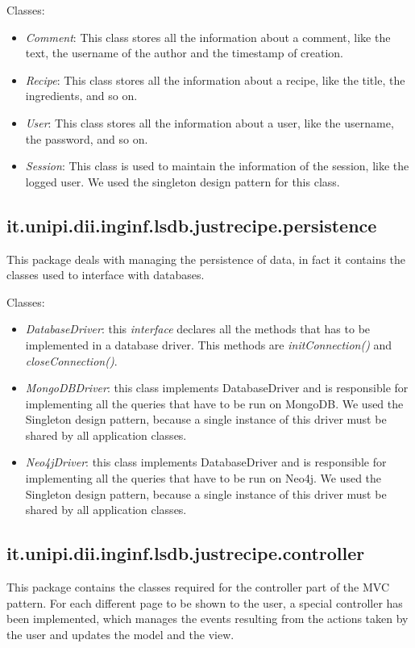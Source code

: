 \documentclass[a4paper]{report}
\begin{document}
\noindent Classes:
  \begin{itemize}
	\item \emph{Comment}: This class stores all the information about a comment, like the text, the username of the author and the timestamp of creation. 
	\item \emph{Recipe}: This class stores all the information about a recipe, like the title, the ingredients, and so on.
	\item \emph{User}: This class stores all the information about a user, like the username, the password, and so on.
	\item \emph{Session}: This class is used to maintain the information of the session, like the logged user. We used the singleton design pattern for this class.
\end{itemize}
\subsection {it.unipi.dii.inginf.lsdb.justrecipe.persistence}
This package deals with managing the persistence of data, in fact it contains the classes used to interface with databases.

\noindent Classes:
 \begin{itemize}
	\item \emph{DatabaseDriver}: this \emph{interface} declares all the methods that has to be implemented in a database driver. This methods are \emph{initConnection()} and \emph{closeConnection()}.  
	\item \emph{MongoDBDriver}: this class implements DatabaseDriver and is responsible for implementing all the queries that have to be run on MongoDB. We used the Singleton design pattern, because a single instance of this driver must be shared by all application classes.
	\item \emph{Neo4jDriver}: this class implements DatabaseDriver and is responsible for implementing all the queries that have to be run on Neo4j. We used the Singleton design pattern, because a single instance of this driver must be shared by all application classes.
\end{itemize}
\subsection {it.unipi.dii.inginf.lsdb.justrecipe.controller}
This package contains the classes required for the controller part of the MVC pattern. For each different page to be shown to the user, a special controller has been implemented, which manages the events resulting from the actions taken by the user and updates the model and the view.
\end{document}

